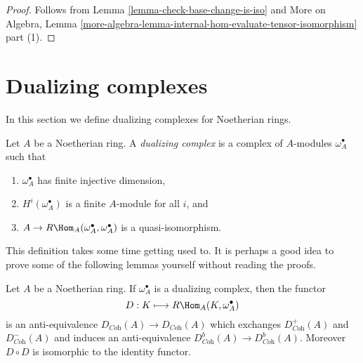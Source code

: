 \begin{proof}
Follows from Lemma \ref{lemma-check-base-change-is-iso} and
More on Algebra, Lemma
\ref{more-algebra-lemma-internal-hom-evaluate-tensor-isomorphism} part (1).
\end{proof}







\section{Dualizing complexes}
\label{section-dualizing}

\noindent
In this section we define dualizing complexes for Noetherian rings.

\begin{definition}
\label{definition-dualizing}
Let $A$ be a Noetherian ring. A {\it dualizing complex} is a
complex of $A$-modules $\omega_A^\bullet$ such that
\begin{enumerate}
\item $\omega_A^\bullet$ has finite injective dimension,
\item $H^i(\omega_A^\bullet)$ is a finite $A$-module for all $i$, and
\item $A \to R\Hom_A(\omega_A^\bullet, \omega_A^\bullet)$
is a quasi-isomorphism.
\end{enumerate}
\end{definition}

\noindent
This definition takes some time getting used to. It is perhaps a good
idea to prove some of the following lemmas yourself without reading
the proofs.

\begin{lemma}
\label{lemma-dualizing}
Let $A$ be a Noetherian ring. If $\omega_A^\bullet$ is a dualizing
complex, then the functor
$$
D : K \longmapsto R\Hom_A(K, \omega_A^\bullet)
$$
is an anti-equivalence $D_{\textit{Coh}}(A) \to D_{\textit{Coh}}(A)$
which exchanges $D^+_{\textit{Coh}}(A)$ and $D^-_{\textit{Coh}}(A)$
and induces an anti-equivalence
$D^b_{\textit{Coh}}(A) \to D^b_{\textit{Coh}}(A)$.
Moreover $D \circ D$ is isomorphic to the identity functor.
\end{lemma}

